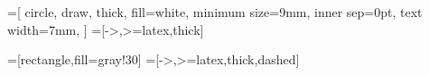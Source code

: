 
=[
    circle,
    draw,
    thick,
    fill=white,
    minimum size=9mm,
    inner sep=0pt,
    text width=7mm,
]
=[->,>=latex,thick]

=[rectangle,fill=gray!30]
=[->,>=latex,thick,dashed]

